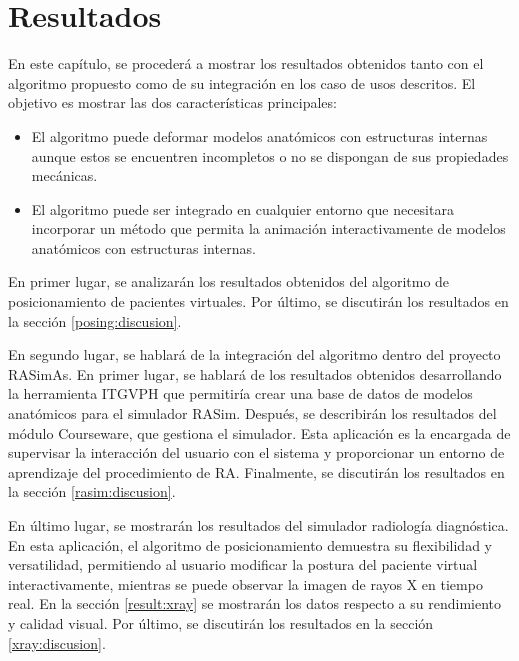 \chapter{Resultados} 
\label{cap:results}

En este capítulo, se procederá a mostrar los resultados obtenidos tanto con el algoritmo propuesto como de su integración en los caso de usos descritos. 
%
El objetivo es mostrar las dos características principales: 
\begin{itemize}
    \item El algoritmo puede deformar modelos anatómicos con estructuras internas aunque estos se encuentren incompletos o no se dispongan de sus propiedades mecánicas. 
    \item El algoritmo puede ser integrado en cualquier entorno que necesitara incorporar un método que permita la animación interactivamente de modelos anatómicos con estructuras internas.
\end{itemize}
En primer lugar, se analizarán los resultados obtenidos del algoritmo de posicionamiento de pacientes virtuales. 
Por último, se discutirán los resultados en la sección \ref{posing:discusion}.

En segundo lugar, se hablará de la integración del algoritmo dentro del proyecto \ac{RASimAs}. En primer lugar, se hablará de los resultados obtenidos desarrollando la herramienta \ac{ITGVPH} que permitiría crear una base de datos de modelos anatómicos para el simulador \ac{RASim}. Después, se describirán los resultados del módulo \ac{Courseware}, que gestiona el simulador. Esta aplicación es la encargada de supervisar la interacción del usuario con el sistema y proporcionar un entorno de aprendizaje del procedimiento de \ac{RA}. Finalmente, se discutirán los resultados en la sección \ref{rasim:discusion}.

En último lugar, se mostrarán los resultados del simulador radiología diagnóstica. En esta aplicación, el algoritmo de posicionamiento demuestra su flexibilidad y versatilidad, permitiendo al usuario modificar la postura del paciente virtual interactivamente, mientras se puede observar la imagen de rayos X en tiempo real. En la sección \ref{result:xray} se mostrarán los datos respecto a su rendimiento y calidad visual. Por último,  se discutirán los resultados en la sección \ref{xray:discusion}.



